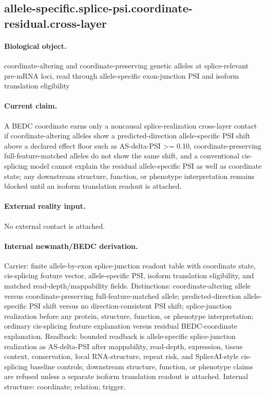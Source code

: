 \subsection{allele-specific.splice-psi.coordinate-residual.cross-layer}

\paragraph{Biological object.} coordinate-altering and coordinate-preserving genetic alleles at splice-relevant pre-mRNA loci, read through allele-specific exon-junction PSI and isoform translation eligibility

\paragraph{Current claim.} A BEDC coordinate earns only a noncausal splice-realization cross-layer contact if coordinate-altering alleles show a predicted-direction allele-specific PSI shift above a declared effect floor such as AS-delta-PSI >= 0.10, coordinate-preserving full-feature-matched alleles do not show the same shift, and a conventional cis-splicing model cannot explain the residual allele-specific PSI as well as coordinate state; any downstream structure, function, or phenotype interpretation remains blocked until an isoform translation readout is attached.

\paragraph{External reality input.}
No external contact is attached.

\paragraph{Internal newmath/BEDC derivation.} Carrier: finite allele-by-exon splice-junction readout table with coordinate state, cis-splicing feature vector, allele-specific PSI, isoform translation eligibility, and matched read-depth/mappability fields. Distinctions: coordinate-altering allele versus coordinate-preserving full-feature-matched allele; predicted-direction allele-specific PSI shift versus no direction-consistent PSI shift; splice-junction realization before any protein, structure, function, or phenotype interpretation; ordinary cis-splicing feature explanation versus residual BEDC-coordinate explanation. Readback: bounded readback is allele-specific splice-junction realization as AS-delta-PSI after mappability, read-depth, expression, tissue context, conservation, local RNA-structure, repeat risk, and SpliceAI-style cis-splicing baseline controls; downstream structure, function, or phenotype claims are refused unless a separate isoform translation readout is attached. Internal structure: coordinate; relation; trigger.

